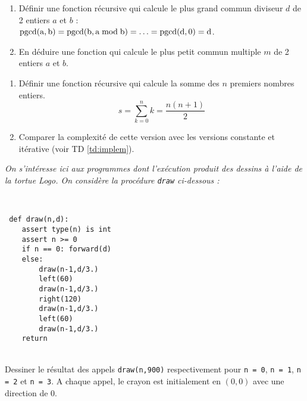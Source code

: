 \begin{td}\label{td:pgcd}
\em
\begin{enumerate}
\item Définir une fonction récursive qui calcule le plus grand commun 
	diviseur $d$ de 2 entiers $a$ et $b$ : \\
	$\rm{pgcd}(a,b) = \rm{pgcd}(b,a \bmod b) = \ldots = \rm{pgcd}(d,0) = d$.
\item En déduire une fonction qui calcule le plus petit commun multiple $m$ de 2 entiers $a$ et $b$.
\end{enumerate}
\end{td}

\begin{td}\label{td:somme}
\em
\begin{enumerate}
\item Définir une fonction récursive qui calcule la somme des $n$ premiers
	nombres entiers.
	$$s = \sum^{n}_{k=0}k = \frac{n(n+1)}{2}$$
\item Comparer la complexité de cette version avec les versions constante
	et itérative (voir TD \ref{td:implem}).
\end{enumerate}
\end{td}

\begin{td}\label{td:fractal}
\em
On s'intéresse ici aux programmes dont l'exécution produit des dessins
à l'aide de la tortue Logo.
On consid\`ere la proc\'edure {\tt draw} ci-dessous :

\mbox{}\ \ \begin{py}{7cm}\tt
def draw(n,d):\\
\mbox{}\ \ \ \ assert type(n) is int\\
\mbox{}\ \ \ \ assert n >= 0\\
\mbox{}\ \ \ \ if n == 0: forward(d)\\
\mbox{}\ \ \ \ else:\\
\mbox{}\ \ \ \ \ \ \ \ draw(n-1,d/3.)\\
\mbox{}\ \ \ \ \ \ \ \ left(60)\\
\mbox{}\ \ \ \ \ \ \ \ draw(n-1,d/3.)\\
\mbox{}\ \ \ \ \ \ \ \ right(120)\\
\mbox{}\ \ \ \ \ \ \ \ draw(n-1,d/3.)\\
\mbox{}\ \ \ \ \ \ \ \ left(60)\\
\mbox{}\ \ \ \ \ \ \ \ draw(n-1,d/3.)\\
\mbox{}\ \ \ \ return
\end{py}\\[1mm]
Dessiner le résultat des appels {\tt draw(n,900)} respectivement pour {\tt n = 0},
	{\tt n = 1}, {\tt n = 2} et {\tt n = 3}. A chaque appel, le crayon est 
	initialement en $(0,0)$ avec une direction de $0$.
\end{td}

